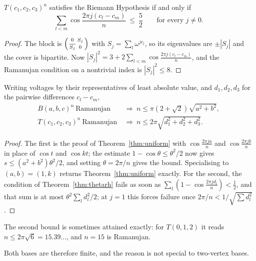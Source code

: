 \begin{theorem}\label{thm:thetarh}
$T(c_1,c_2,c_3)^{n}$ satisfies the Riemann Hypothesis if and only if
\[
  \sum_{l<m}\cos\frac{2\pi j(c_l-c_m)}{n}\ \le\ \frac52
  \qquad\text{for every }j\ne0 .
\]
\end{theorem}

\begin{proof}
The block is $\begin{psmallmatrix}0&S_j\\ \overline{S_j}&0\end{psmallmatrix}$
with $S_j=\sum_l\omega^{jc_l}$, so its eigenvalues are $\pm|S_j|$ and the cover
is bipartite. Now $|S_j|^{2}=3+2\sum_{l<m}\cos\frac{2\pi j(c_l-c_m)}{n}$, and
the Ramanujan condition on a nontrivial index is $|S_j|^{2}\le8$.
\end{proof}

\begin{theorem}\label{thm:covfinite}
Writing voltages by their representatives of least absolute value, and $d_1,d_2,d_3$
for the pairwise differences $c_l-c_m$,
\begin{align*}
  B(a,b,c)^{n}\ \text{Ramanujan}\ &\Longrightarrow\ n\le\pi(2+\sqrt2)\sqrt{a^{2}+b^{2}},\\
  T(c_1,c_2,c_3)^{n}\ \text{Ramanujan}\ &\Longrightarrow\ n\le2\pi\sqrt{d_1^{2}+d_2^{2}+d_3^{2}} .
\end{align*}
\end{theorem}

\begin{proof}
The first is the proof of Theorem~\ref{thm:uniform} with $\cos\frac{2\pi ja}{n}$
and $\cos\frac{2\pi jb}{n}$ in place of $\cos t$ and $\cos kt$; the estimate
$1-\cos\theta\le\theta^{2}/2$ now gives $s\le(a^{2}+b^{2})\theta^{2}/2$, and
setting $\theta=2\pi/n$ gives the bound. Specialising to $(a,b)=(1,k)$ returns
Theorem~\ref{thm:uniform} exactly. For the second, the condition of
Theorem~\ref{thm:thetarh} fails as soon as $\sum_l(1-\cos\frac{2\pi jd_l}{n})<\tfrac12$,
and that sum is at most $\theta^{2}\sum_ld_l^{2}/2$; at $j=1$ this forces
failure once $2\pi/n<1/\sqrt{\sum d_l^{2}}$.
\end{proof}

The second bound is sometimes attained exactly: for $T(0,1,2)$ it reads
$n\le2\pi\sqrt6=15.39\ldots$, and $n=15$ is Ramanujan.

Both bases are therefore finite, and the reason is not special to two-vertex
bases.

